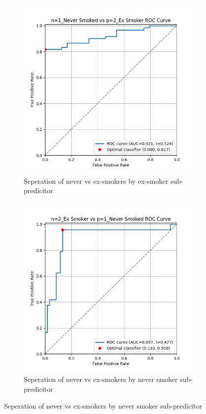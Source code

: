 \documentclass{article}
\begin{document}
\begin{figure}[H]
    \begin{subfigure}{0.43\textwidth}
        \centering
        \includegraphics[width=\linewidth]{cohort1_1v2_roc.png}
        \caption{Seperation of never vs ex-smokers by ex-smoker sub-predicitor}
    \end{subfigure}
    \hfill
    \begin{subfigure}{0.43\textwidth}
        \centering
        \includegraphics[width=\linewidth]{cohort1_2v1_roc.png}
        \caption{Seperation of never vs ex-smokers by never smoker sub-predicitor}
    \end{subfigure}


\end{figure}
\end{document}
